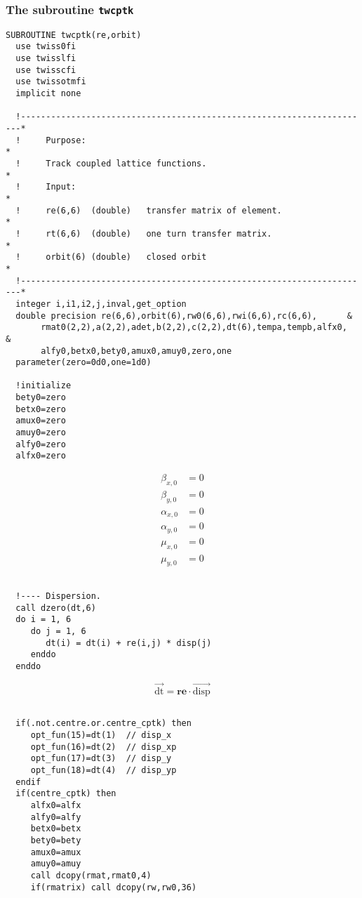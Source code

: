 \documentclass{cern-art} %
\renewcommand{\L}[1]{\lstinline[firstnumber=last]{#1}}
\begin{document}
\subsubsection*{The subroutine \L{twcptk}}
\begin{lstlisting}[firstnumber=1]
SUBROUTINE twcptk(re,orbit)
  use twiss0fi
  use twisslfi
  use twisscfi
  use twissotmfi
  implicit none

  !----------------------------------------------------------------------*
  !     Purpose:                                                         *
  !     Track coupled lattice functions.                                 *
  !     Input:                                                           *
  !     re(6,6)  (double)   transfer matrix of element.                  *
  !     rt(6,6)  (double)   one turn transfer matrix.                    *
  !     orbit(6) (double)   closed orbit                                 *
  !----------------------------------------------------------------------*
  integer i,i1,i2,j,inval,get_option
  double precision re(6,6),orbit(6),rw0(6,6),rwi(6,6),rc(6,6),      &
       rmat0(2,2),a(2,2),adet,b(2,2),c(2,2),dt(6),tempa,tempb,alfx0,     &
       alfy0,betx0,bety0,amux0,amuy0,zero,one
  parameter(zero=0d0,one=1d0)

  !initialize
  bety0=zero
  betx0=zero
  amux0=zero
  amuy0=zero
  alfy0=zero
  alfx0=zero
\end{lstlisting}

\[
\begin{aligned}\beta_{x,0} & =0\\
\beta_{y,0} & =0\\
\alpha_{x,0} & =0\\
\alpha_{y,0} & =0\\
\mu_{x,0} & =0\\
\mu_{y,0} & =0
\end{aligned}
\]

\begin{lstlisting}[firstnumber=last]

  !---- Dispersion.
  call dzero(dt,6)
  do i = 1, 6
     do j = 1, 6
        dt(i) = dt(i) + re(i,j) * disp(j)
     enddo
  enddo
\end{lstlisting}

\[
\vec{\text{dt}}=\mathbf{re}\cdot\vec{\text{disp}}
\]

\begin{lstlisting}[firstnumber=last]

  if(.not.centre.or.centre_cptk) then
     opt_fun(15)=dt(1)  // disp_x
     opt_fun(16)=dt(2)  // disp_xp
     opt_fun(17)=dt(3)  // disp_y
     opt_fun(18)=dt(4)  // disp_yp
  endif
  if(centre_cptk) then
     alfx0=alfx
     alfy0=alfy
     betx0=betx
     bety0=bety
     amux0=amux
     amuy0=amuy
     call dcopy(rmat,rmat0,4)
     if(rmatrix) call dcopy(rw,rw0,36)
\end{lstlisting}
\end{document}
